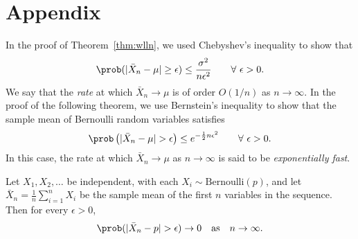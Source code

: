 
\section{Appendix}\label{appx:expe}


In the proof of Theorem~\ref{thm:wlln}, we used Chebyshev's inequality to show that
\[
\prob(|\bar{X}_n - \mu| \geq \epsilon) \leq \frac{\sigma^2}{n\epsilon^2} \qquad\forall\ \epsilon>0.
\]
We say that the \emph{rate} at which $\bar{X}_n\to\mu$ is of order $O(1/n)$ as $n\to\infty$.
%
In the proof of the following theorem, we use Bernstein's inequality to show that the sample mean of Bernoulli random variables satisfies
\[
\prob\left(|\bar{X}_n - \mu| > \epsilon\right) \leq e^{-\frac{1}{2}n\epsilon^2}  \qquad\forall\ \epsilon>0.
\]
In this case, the rate at which $\bar{X}_n\to\mu$ as $n\to\infty$ is said to be \emph{exponentially fast}. 

\begin{theorem}\label{thm:bernoulli_lln}
Let $X_1,X_2,\ldots$ be independent, with each $X_i\sim\text{Bernoulli}(p)$, and let $\bar{X}_n = \frac{1}{n}\sum_{i=1}^n X_i$ be the sample mean of the first $n$ variables in the sequence.
Then for every $\epsilon > 0$, 
\[
\prob(|\bar{X}_n - p| > \epsilon) \to 0 \text{\quad as\quad} n\to\infty.
\]
\end{theorem}

